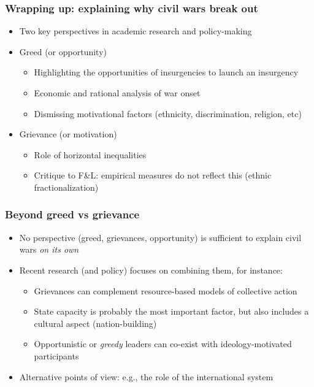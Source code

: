 \documentclass[aspectratio=43]{beamer}
\begin{document}
\begin{frame}
\frametitle{Wrapping up: explaining why civil wars break out}
\centering

\begin{itemize}
  \item<1-> Two key perspectives in academic research and policy-making
  \item<2-> Greed (or opportunity)
    \begin{itemize}
      \item Highlighting the opportunities of insurgencies to launch an insurgency
      \item Economic and rational analysis of war onset
      \item Dismissing motivational factors (ethnicity, discrimination, religion, etc)
    \end{itemize}
  \item<3-> Grievance (or motivation)
  \begin{itemize}
    \item Role of horizontal inequalities
    \item Critique to F\&L: empirical measures do not reflect this (ethnic fractionalization)
  \end{itemize}
\end{itemize}

\end{frame}

\begin{frame}
\frametitle{Beyond greed vs grievance}
\centering

\begin{itemize}
  \item No perspective (greed, grievances, opportunity) is sufficient to explain civil wars \textit{on its own}
  \item Recent research (and policy) focuses on combining them, for instance:
  \begin{itemize}
    \item Grievances can complement resource-based models of collective action
    \item State capacity is probably the most important factor, but also includes a cultural aspect (nation-building)
    \item Opportunistic or \textit{greedy} leaders can co-exist with ideology-motivated participants
  \end{itemize}
  \item Alternative points of view: e.g., the role of the international system
\end{itemize}

\end{frame}
\end{document}
